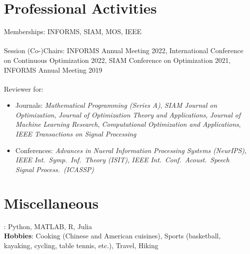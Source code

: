 \documentclass[11pt]{article}
\newcommand{\ICASSP}{IEEE Int.\ Conf.\ Acoust.\ Speech Signal Process.\ (ICASSP)}
\newcommand{\ISIT}{IEEE Int.\ Symp.\ Inf.\ Theory (ISIT)}
\newcommand{\TSP}{IEEE Transactions on Signal Processing}
\newcommand{\SIOPT}{SIAM Journal on Optimization}
\newcommand{\JMLR}{Journal of Machine Learning Research}
\newcommand{\MPA}{Mathematical Programming (Series A)}
\newcommand{\COA}{Computational Optimization and Applications}
\newcommand{\JOTA}{Journal of Optimization Theory and Applications}
\newcommand{\NIPS}{Advances in Nueral Information Processing Systems (NeurIPS)}
\begin{document}
    


\section*{Professional Activities}
{\noindent
Memberships: INFORMS, SIAM, MOS, IEEE\\\\
Session (Co-)Chairs: INFORMS Annual Meeting 2022, International Conference on Continuous Optimization 2022, SIAM Conference on Optimization 2021, INFORMS Annual Meeting 2019\\\\
Reviewer for: 
\begin{itemize}
\item Journals: {\em \MPA}, {\em\SIOPT}, {\em\JOTA}, {\em\JMLR}, {\em\COA}, {\em\TSP}
\item Conferences: {\em\NIPS}, {\em\ISIT}, {\em\ICASSP}
\end{itemize}   %
}

\section*{Miscellaneous}

{: Python, MATLAB, R, Julia\\ 
{\bf Hobbies}: Cooking (Chinese and American cuisines), Sports (basketball, kayaking, cycling, table tennis, etc.), Travel, Hiking}
\end{document}
